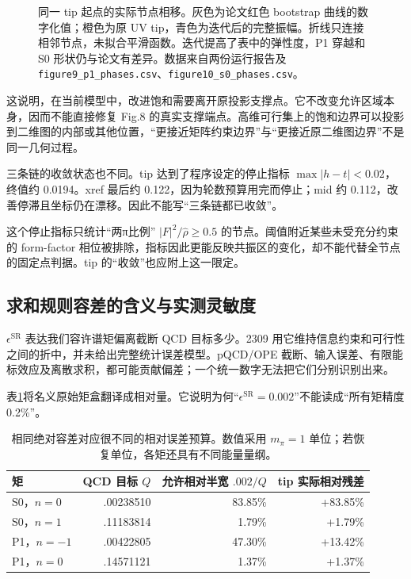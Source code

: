 \documentclass[UTF8,a4paper,11pt,fontset=fandol]{ctexart}
\numberwithin{equation}{section}
\newcommand{\eSR}{\epsilon^{\mathrm{SR}}}
\newcommand{\code}[1]{{\urlstyle{tt}\nolinkurl{#1}}}
\begin{document}
\begin{figure}[H]
\caption{同一 tip 起点的实际节点相移。灰色为论文红色 bootstrap 曲线的数字化值；橙色为原 UV tip，青色为迭代后的完整振幅。折线只连接相邻节点，未拟合平滑函数。迭代提高了表中的弹性度，P1 穿越和 S0 形状仍与论文有差异。数据来自两份运行报告及 \code{figure9_p1_phases.csv}、\code{figure10_s0_phases.csv}。}
\end{figure}

这说明，在当前模型中，改进饱和需要离开原投影支撑点。它不改变允许区域本身，因而不能直接修复 Fig.8 的真实支撑端点。高维可行集上的饱和边界可以投影到二维图的内部或其他位置，“更接近矩阵约束边界”与“更接近原二维图边界”不是同一几何过程。

三条链的收敛状态也不同。tip 达到了程序设定的停止指标 \(\max|h-t|<0.02\)，终值约 0.0194。xref 最后约 0.122，因为轮数预算用完而停止；mid 约 0.112，改善停滞且坐标仍在漂移。因此不能写“三条链都已收敛”。

这个停止指标只统计“两π比例” \(|F|^2/\widehat\rho\ge0.5\) 的节点。阈值附近某些未受充分约束的 form-factor 相位被排除，指标因此更能反映共振区的变化，却不能代替全节点的固定点判据。tip 的“收敛”也应附上这一限定。

\subsection{求和规则容差的含义与实测灵敏度}
\(\eSR\) 表达我们容许谱矩偏离截断 QCD 目标多少。2309 用它维持信息约束和可行性之间的折中，并未给出完整统计误差模型。pQCD/OPE 截断、输入误差、有限能标效应及离散求积，都可能贡献偏差；一个统一数字无法把它们分别识别出来。

表\ref{tab:srrelative}将名义原始矩盒翻译成相对量。它说明为何“\(\eSR=0.002\)”不能读成“所有矩精度 0.2\%”。
\begin{table}[H]\centering\small
\begin{tabular}{lrrr}
\toprule
矩 & QCD 目标 \(Q\) & 允许相对半宽 \(.002/Q\) & tip 实际相对残差\\
\midrule
S0，\(n=0\) & .00238510 & 83.85\% & +83.85\%\\
S0，\(n=1\) & .11183814 & 1.79\% & +1.79\%\\
P1，\(n=-1\) & .00422805 & 47.30\% & +13.42\%\\
P1，\(n=0\) & .14571121 & 1.37\% & +1.37\%\\
\bottomrule
\end{tabular}
\caption{相同绝对容差对应很不同的相对误差预算。数值采用 \(m_\pi=1\) 单位；若恢复单位，各矩还具有不同能量量纲。}\label{tab:srrelative}
\end{table}
\end{document}
